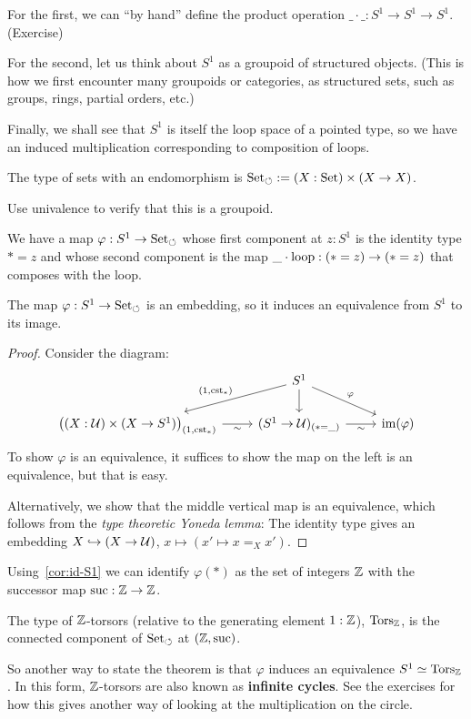 \documentclass[10pt,oneside,leqno,openright]{memoir}
\begin{document}
For the first, we can ``by hand'' define the product operation $\_ \cdot \_ : S^1 \to S^1 \to S^1$. (Exercise)

For the second, let us think about $S^1$ as a groupoid of structured objects. (This is how we first encounter many groupoids or categories, as structured sets, such as groups, rings, partial orders, etc.)

Finally, we shall see that $S^1$ is itself the loop space of a pointed type, so we have
an induced multiplication corresponding to composition of loops.

\begin{definition}
  The type of sets with an endomorphism is $\operatorname{Set}_\circlearrowleft := (X : \operatorname{Set}) \times (X \to X)$.
\end{definition}
Use univalence to verify that this is a groupoid.

We have a map $\varphi : S^1 \to \operatorname{Set}_\circlearrowleft$ whose first component at $z : S^1$ is
the identity type $\ast = z$ and whose second component is the map $\_ \cdot \mathrm{loop} : (\ast = z) \to (\ast = z)$ that composes with the loop.

\begin{theorem}\label{thm:S1-InfCyc}
  The map $\varphi : S^1 \to \operatorname{Set}_\circlearrowleft$ is an embedding, so it induces an equivalence
  from $S^1$ to its image.
\end{theorem}
\begin{proof}
  Consider the diagram:
  \begin{equation}\label{eq:setbundle-Sc-univ-comp}
  \begin{tikzcd}
    & S^1\ar[dl,"{(1,\cst_\ast)}"']\ar[d]\ar[dr,"\varphi"] & \\
    \bigl((X:\UU)\times(X\to S^1)\bigr)_{(1,\cst_\ast)} \ar[r,"\sim"']
    & (S^1\to\UU)_{(\ast=\blank)} \ar[r,"\sim"']
    & \im(\varphi)
  \end{tikzcd}
\end{equation}
To show $\varphi$ is an equivalence, it suffices to show the map on the left is
an equivalence, but that is easy.

Alternatively, we show that the middle vertical map is an equivalence, which follows from the \emph{type theoretic Yoneda lemma}: The identity type gives an embedding $X \hookrightarrow (X \to \mathcal{U})$, $x\mapsto (x' \mapsto x=_Xx')$.
\end{proof}
Using~\cref{cor:id-S1} we can identify $\varphi(\ast)$ as the set of integers
$\mathbb{Z}$ with the successor map $\operatorname{suc} : \mathbb{Z} \to \mathbb{Z}$.

\begin{definition}
  The type of $\mathbb{Z}$-torsors (relative to the generating element $1:\mathbb{Z}$), $\operatorname{Tors}_{\mathbb{Z}}$,
  is the connected component of $\operatorname{Set}_\circlearrowleft$ at $(\mathbb{Z},\operatorname{suc})$.
\end{definition}
So another way to state the theorem is that $\varphi$ induces an equivalence
$S^1 \simeq \operatorname{Tors}_{\mathbb{Z}}$. In this form, $\mathbb{Z}$-torsors are also known as \textbf{infinite cycles}.
See the exercises for how this gives another way of looking at the multiplication on the circle.
\end{document}
